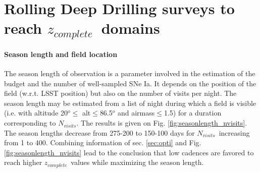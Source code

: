 \documentclass[\docopts]{\docclass}
\newcommand{\snrb}{\mbox{$SNR^b$}}
\newcommand{\sne}{{SNe Ia}}
\newcommand{\zcomp}{\mbox{$z_{complete}$}}
\newcommand{\nvisits}{$N_{visits}$}
\begin{document}

\section{Rolling Deep Drilling surveys to reach \zcomp~domains}
\label{sec:scenario}
\paragraph{Season length and field location}
The season length of observation is a parameter involved in the estimation of the budget and the number of well-sampled \sne.  It depends on the position of the field (w.r.t. LSST position) but also on the number of visits per night. The season length may be estimated from a list of night during which a field is visible (i.e. with altitude 20$^o\leq$ alt$\leq$86.5$^o$ and airmass$\leq$1.5) for a duration corresponding to \nvisits.  The results is given on Fig. \ref{fig:seasonlength_nvisits}. The season lengths decrease from 275-200 to 150-100 days for \nvisits~increasing from 1 to 400.  Combining information of sec. \ref{sec:opti} and Fig. \ref{fig:seasonlength_nvisits} lead to the conclusion that low cadences are favored to reach higher \zcomp~values while maximizing the season length.
\end{document}

